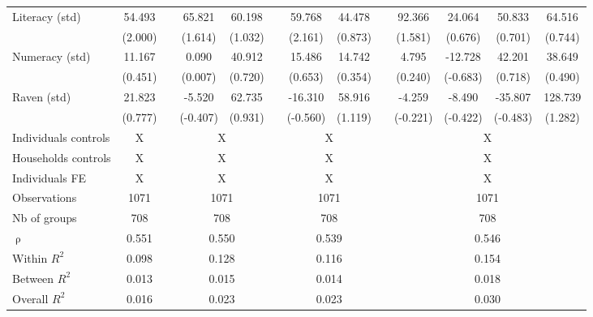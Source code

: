 \begin{table}[htbp]
{\begin{tabular}{lcccccccccccc}
    Literacy (std) & \cellcolor[rgb]{ 1,  1,  0}54.493 &       & 65.821 & 60.198 &       & \cellcolor[rgb]{ 1,  1,  0}59.768 & 44.478 &       & 92.366 & 24.064 & 50.833 & 64.516 \\
          & (2.000) &       & (1.614) & (1.032) &       & (2.161) & (0.873) &       & (1.581) & (0.676) & (0.701) & (0.744) \\
    Numeracy (std) & 11.167 &       & 0.090 & 40.912 &       & 15.486 & 14.742 &       & 4.795 & -12.728 & 42.201 & 38.649 \\
          & (0.451) &       & (0.007) & (0.720) &       & (0.653) & (0.354) &       & (0.240) & (-0.683) & (0.718) & (0.490) \\
    Raven (std) & 21.823 &       & -5.520 & 62.735 &       & -16.310 & 58.916 &       & -4.259 & -8.490 & -35.807 & 128.739 \\
          & (0.777) &       & (-0.407) & (0.931) &       & (-0.560) & (1.119) &       & (-0.221) & (-0.422) & (-0.483) & (1.282) \\
\cmidrule{1-2}\cmidrule{4-5}\cmidrule{7-8}\cmidrule{10-13}    Individuals controls & X     &       & \multicolumn{2}{c}{X} &       & \multicolumn{2}{c}{X} &       & \multicolumn{4}{c}{X} \\
    Households controls & X     &       & \multicolumn{2}{c}{X} &       & \multicolumn{2}{c}{X} &       & \multicolumn{4}{c}{X} \\
    Individuals FE & X     &       & \multicolumn{2}{c}{X} &       & \multicolumn{2}{c}{X} &       & \multicolumn{4}{c}{X} \\
    \midrule
    Observations & 1071  &       & \multicolumn{2}{c}{1071} &       & \multicolumn{2}{c}{1071} &       & \multicolumn{4}{c}{1071} \\
    Nb of groups & 708   &       & \multicolumn{2}{c}{708} &       & \multicolumn{2}{c}{708} &       & \multicolumn{4}{c}{708} \\
    $\uprho$ & 0.551 &       & \multicolumn{2}{c}{0.550} &       & \multicolumn{2}{c}{0.539} &       & \multicolumn{4}{c}{0.546} \\
    Within $R^2$ & 0.098 &       & \multicolumn{2}{c}{0.128} &       & \multicolumn{2}{c}{0.116} &       & \multicolumn{4}{c}{0.154} \\
    Between $R^2$ & 0.013 &       & \multicolumn{2}{c}{0.015} &       & \multicolumn{2}{c}{0.014} &       & \multicolumn{4}{c}{0.018} \\
    Overall $R^2$ & 0.016 &       & \multicolumn{2}{c}{0.023} &       & \multicolumn{2}{c}{0.023} &       & \multicolumn{4}{c}{0.030} \\

\end{tabular}}
\end{table}
